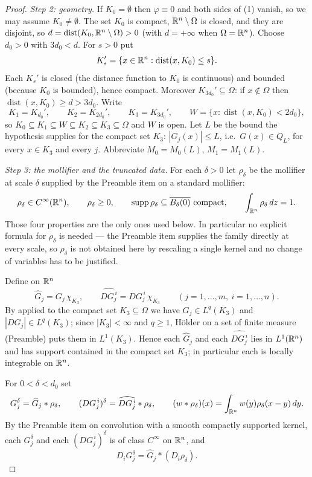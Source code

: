 \begin{proof}
\emph{Step 2: geometry.}  If $K_0=\emptyset$ then $\varphi\equiv0$ and both
sides of (1) vanish, so we may assume $K_0\ne\emptyset$.  The set $K_0$ is
compact, $\mathbb{R}^n\setminus\Omega$ is closed, and they are disjoint, so
$d=\operatorname{dist}(K_0,\mathbb{R}^n\setminus\Omega)>0$ (with $d=+\infty$ when
$\Omega=\mathbb{R}^n$).  Choose $d_0>0$ with $3d_0<d$.  For $s>0$ put
\[
K_s'=\{x\in\mathbb{R}^n:\operatorname{dist}(x,K_0)\le s\} .
\]
Each $K_s'$ is closed (the distance function to $K_0$ is continuous) and
bounded (because $K_0$ is bounded), hence compact.  Moreover
$K_{3d_0}'\subseteq\Omega$: if $x\notin\Omega$ then
$\operatorname{dist}(x,K_0)\ge d>3d_0$.  Write
\[
K_1=K_{d_0}',\qquad K_2=K_{2d_0}',\qquad K_3=K_{3d_0}',
\qquad W=\{x:\operatorname{dist}(x,K_0)<2d_0\} ,
\]
so $K_0\subseteq K_1\subseteq W\subseteq K_2\subseteq K_3\subseteq\Omega$ and
$W$ is open.  Let $L$ be the bound the hypothesis supplies for the compact set
$K_3$: $|G_j(x)|\le L$, i.e.\ $G(x)\in Q_L$, for every $x\in K_3$ and every $j$.
Abbreviate $M_0=M_0(L)$, $M_1=M_1(L)$.

\emph{Step 3: the mollifier and the truncated data.}  For each $\delta>0$ let $\rho_\delta$ be the mollifier at scale $\delta$
supplied by the Preamble item on a standard mollifier:
\[
\rho_\delta\in C^\infty(\R^n),\qquad \rho_\delta\ge0,\qquad
\operatorname{supp}\rho_\delta\subseteq\overline{B_\delta(0)}\ \text{compact},
\qquad \int_{\R^n}\rho_\delta\,dz=1 .
\]
Those four properties are the only ones used below.  In particular no explicit
formula for $\rho_\delta$ is needed --- the Preamble item supplies the family
directly at every scale, so $\rho_\delta$ is not obtained here by rescaling a
single kernel and no change of variables has to be justified.

Define on $\mathbb{R}^n$
\[
\widehat G_j=G_j\,\chi_{K_3},\qquad
\widehat{DG_j^{\,i}}=DG_j^{\,i}\,\chi_{K_3}
\qquad(j=1,\dots,m,\ i=1,\dots,n).
\]
By  applied to the compact set $K_3\subseteq\Omega$ we have
$G_j\in L^q(K_3)$ and $|DG_j|\in L^q(K_3)$; since $|K_3|<\infty$ and $q\ge1$,
H\"older on a set of finite measure (Preamble) puts them in $L^1(K_3)$.  Hence
each $\widehat G_j$ and each $\widehat{DG_j^{\,i}}$ lies in $L^1(\mathbb{R}^n)$ and has
support contained in the compact set $K_3$; in particular each is locally
integrable on $\mathbb{R}^n$.

For $0<\delta<d_0$ set
\[
G_j^\delta=\widehat G_j*\rho_\delta,\qquad
(DG_j^{\,i})^\delta=\widehat{DG_j^{\,i}}*\rho_\delta ,
\qquad
(w*\rho_\delta)(x)=\int_{\mathbb{R}^n}w(y)\rho_\delta(x-y)\,dy .
\]
By the Preamble item on convolution with a smooth compactly supported kernel,
each $G_j^\delta$ and each $(DG_j^{\,i})^\delta$ is of class $C^\infty$ on
$\mathbb{R}^n$, and
\[
D_iG_j^\delta=\widehat G_j*(D_i\rho_\delta) .
\tag{2}
\]


\end{proof}
